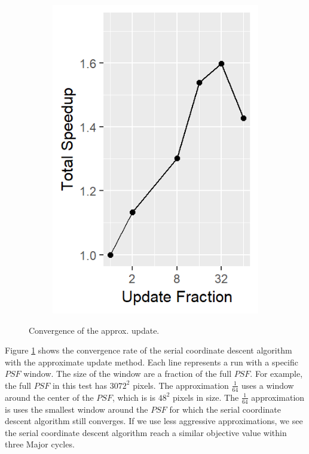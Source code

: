\begin{figure}[h]
\begin{subfigure}[b]{0.195\linewidth}
	\end{subfigure}
	\begin{subfigure}[b]{0.195\linewidth}
		\includegraphics[width=\linewidth]{./chapters/10.results/gradient/ApproxUpdate/speedup_total.png}
	\end{subfigure}
	
	\caption{Convergence of the approx. update.}
	\label{results:gradients:update}
\end{figure}

Figure \ref{results:gradients:update} shows the convergence rate of the serial coordinate descent algorithm with the approximate update method. Each line represents a run with a specific $PSF$ window. The size of the window are a fraction of the full $PSF$. For example, the full $PSF$ in this test has $3072^2$ pixels. The approximation $\frac{1}{64}$ uses a window around the center of the $PSF$, which is is $48^2$ pixels in size. The $\frac{1}{64}$  approximation is uses the smallest window around the $PSF$ for which the serial coordinate descent algorithm still converges. If we use less aggressive approximations, we see the serial coordinate descent algorithm reach a similar objective value within three Major cycles. 

